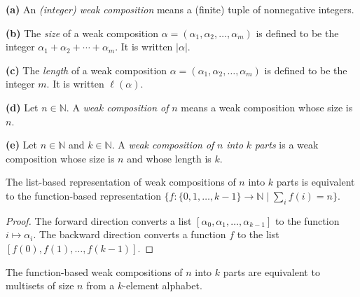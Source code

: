 \begin{definition}
\label{def.fps.wcomps}
\leantarget
\leanok
\textbf{(a)} An \emph{(integer) weak composition} means
a (finite) tuple of nonnegative integers. \medskip

\textbf{(b)} The \emph{size} of a weak composition $\alpha=\left(  \alpha
_{1},\alpha_{2},\ldots,\alpha_{m}\right)  $ is defined to be the integer
$\alpha_{1}+\alpha_{2}+\cdots+\alpha_{m}$. It is written $\left\vert
\alpha\right\vert $. \medskip

\textbf{(c)} The \emph{length} of a weak composition $\alpha=\left(
\alpha_{1},\alpha_{2},\ldots,\alpha_{m}\right)  $ is defined to be the integer
$m$. It is written $\ell\left(  \alpha\right)  $. \medskip

\textbf{(d)} Let $n\in\mathbb{N}$. A \emph{weak composition of }$n$ means a
weak composition whose size is $n$. \medskip

\textbf{(e)} Let $n\in\mathbb{N}$ and $k\in\mathbb{N}$. A \emph{weak
composition of }$n$\emph{ into }$k$\emph{ parts} is a weak composition whose
size is $n$ and whose length is $k$.
\end{definition}

\begin{lemma}
\label{lem.fps.wcomps.equiv-fun}
\leanhelper
\leanok
The list-based representation of weak compositions of $n$ into $k$ parts
is equivalent to the function-based representation
$\{f : \{0, 1, \ldots, k-1\} \to \mathbb{N} \mid \sum_{i} f(i) = n\}$.
\end{lemma}

\begin{proof}
\leanok
The forward direction converts a list $[\alpha_0, \alpha_1, \ldots, \alpha_{k-1}]$
to the function $i \mapsto \alpha_i$.
The backward direction converts a function $f$
to the list $[f(0), f(1), \ldots, f(k-1)]$.
\end{proof}

\begin{lemma}
\label{lem.fps.wcomps.equiv-sym}
\leanhelper
\leanok
The function-based weak compositions of $n$ into $k$ parts are equivalent
to multisets of size $n$ from a $k$-element alphabet.
\end{lemma}

